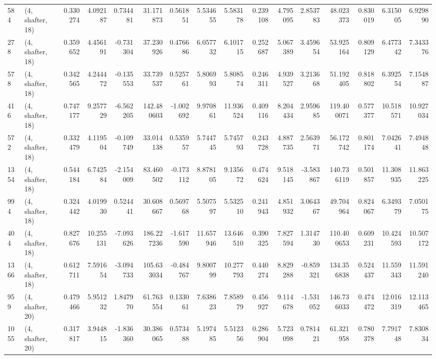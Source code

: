 \begin{tabular}{llrrrrrrrrrrrrrr}
584  &  (4, shafter, 18) &   0.330274 &   4.092187 &   0.734481 &     31.171873 &    0.561851 &    5.534655 &    5.583178 &  0.239108 &   4.795095 &   2.853783 &    48.023373 &   0.830019 &   6.315005 &   6.929890 \\
278  &  (4, shafter, 18) &   0.359652 &   4.456191 &  -0.731304 &     37.230926 &    0.476686 &    6.057732 &    6.101715 &  0.252687 &   5.067389 &   3.459654 &    53.925164 &   0.809129 &   6.477342 &   7.343376 \\
578  &  (4, shafter, 18) &   0.342565 &   4.244472 &  -0.135553 &     33.739537 &    0.525761 &    5.806993 &    5.808574 &  0.246311 &   4.939527 &   3.213668 &    51.192405 &   0.818802 &   6.392554 &   7.154887 \\
416  &  (4, shafter, 18) &   0.747177 &   9.257729 &  -6.562205 &    142.480603 &   -1.002692 &    9.970861 &   11.936524 &  0.409116 &   8.204434 &   2.959685 &   119.400071 &   0.577377 &  10.518571 &  10.927034 \\
572  &  (4, shafter, 18) &   0.332479 &   4.119504 &  -0.109749 &     33.014138 &    0.535957 &    5.744745 &    5.745793 &  0.243728 &   4.887735 &   2.563971 &    56.172742 &   0.801174 &   7.042641 &   7.494848 \\
1354 &  (4, shafter, 18) &   0.544184 &   6.742584 &  -2.154009 &     83.460502 &   -0.173112 &    8.878105 &    9.135672 &  0.474624 &   9.518145 &  -3.583867 &   140.736119 &   0.501857 &  11.308935 &  11.863225 \\
994  &  (4, shafter, 18) &   0.324442 &   4.019930 &   0.524441 &     30.608667 &    0.569768 &    5.507597 &    5.532510 &  0.241943 &   4.851932 &   3.064367 &    49.704964 &   0.824067 &   6.349379 &   7.050175 \\
404  &  (4, shafter, 18) &   0.827676 &  10.255131 &  -7.093626 &    186.227236 &   -1.617590 &   11.657946 &   13.646510 &  0.390325 &   7.827594 &   1.314730 &   110.400653 &   0.609231 &  10.424593 &  10.507172 \\
1366 &  (4, shafter, 18) &   0.612711 &   7.591654 &  -3.094733 &    105.633034 &   -0.484767 &    9.800799 &   10.277793 &  0.440274 &   8.829288 &  -0.859321 &   134.356838 &   0.524437 &  11.559343 &  11.591240 \\
959  &  (4, shafter, 20) &   0.479466 &   5.951232 &   1.847970 &     61.763554 &    0.133061 &    7.638623 &    7.858979 &  0.456927 &   9.114678 &  -1.531052 &   146.736033 &   0.474472 &  12.016319 &  12.113465 \\
1055 &  (4, shafter, 20) &   0.317817 &   3.944815 &  -1.836360 &     30.386065 &    0.573488 &    5.197485 &    5.512356 &  0.286904 &   5.723098 &   0.781421 &    61.321958 &   0.780378 &   7.791748 &   7.830834 \\

\end{tabular}
